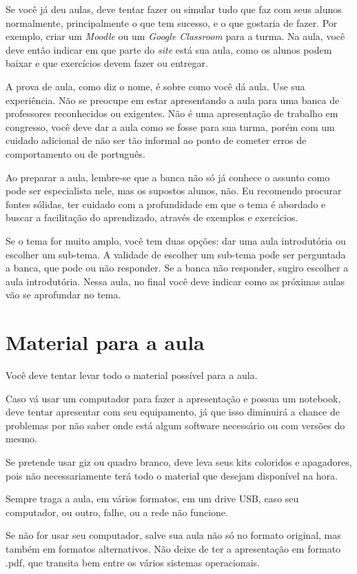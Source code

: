\documentclass{article}
\begin{document}
Se você já deu aulas, deve tentar fazer ou simular tudo que faz com seus alunos normalmente, principalmente o que tem sucesso, e o que gostaria de fazer. Por exemplo, criar um \textit{Moodle} ou um \textit{Google Classroom} para a turma. Na aula, você deve então indicar em que parte do \textit{site} está sua aula, como os alunos podem baixar e que exercícios devem fazer ou entregar.

A prova de aula, como diz o nome, é sobre como você dá aula. Use sua experiência. Não se preocupe em estar apresentando a aula para uma banca de professores reconhecidos ou exigentes. Não é uma apresentação de trabalho em congresso, você deve dar a aula  como se fosse para sua turma, porém com um cuidado adicional de não ser tão informal ao ponto de cometer erros de comportamento ou de português.

Ao preparar a aula, lembre-se que a banca não só já conhece o assunto como pode ser especialista nele, mas os supostos alunos, não. Eu recomendo procurar fontes sólidas, ter cuidado com a profundidade em que o tema é abordado e buscar a facilitação do aprendizado, através de exemplos e exercícios.

Se o tema for muito amplo, você tem duas opções: dar uma aula introdutória ou escolher um sub-tema. A validade de escolher um sub-tema pode ser perguntada a banca, que pode ou não responder. Se a banca não responder, sugiro escolher a aula introdutória. Nessa aula, no final você deve indicar como as próximas aulas vão se aprofundar no tema.

\section{Material para a aula}

Você deve tentar levar todo o material possível para a aula.

Caso vá usar um computador para fazer a apresentação e possua um notebook, deve tentar apresentar com seu equipamento, já que isso diminuirá a chance de problemas por não saber onde está algum software necessário ou com versões do mesmo.

Se pretende usar giz ou quadro branco, deve leva seus kits coloridos e apagadores, pois não necessariamente terá todo o material que desejam disponível na hora.

Sempre traga a aula, em vários formatos, em um drive USB, caso seu computador, ou outro, falhe, ou a rede não funcione.

Se não for usar seu computador, salve sua aula não só no formato original, mas também em formatos alternativos. Não deixe de ter a apresentação em formato .pdf, que transita bem entre os vários sistemas operacionais.
\end{document}
